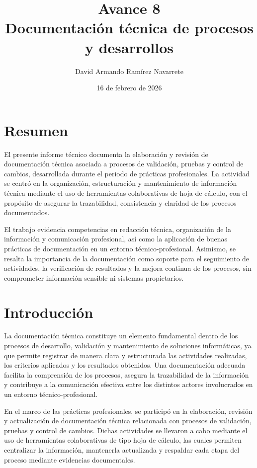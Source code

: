 \documentclass[12pt]{article}
\title{Avance 8 \\ Documentación técnica de procesos y desarrollos}
\author{David Armando Ramírez Navarrete}
\date{16 de febrero de 2026}
\begin{document}
\maketitle

\section*{Resumen}
El presente informe técnico documenta la elaboración y revisión de documentación técnica asociada a procesos de validación, pruebas y control de cambios, desarrollada durante el periodo de prácticas profesionales. La actividad se centró en la organización, estructuración y mantenimiento de información técnica mediante el uso de herramientas colaborativas de hoja de cálculo, con el propósito de asegurar la trazabilidad, consistencia y claridad de los procesos documentados.

El trabajo evidencia competencias en redacción técnica, organización de la información y comunicación profesional, así como la aplicación de buenas prácticas de documentación en un entorno técnico-profesional. Asimismo, se resalta la importancia de la documentación como soporte para el seguimiento de actividades, la verificación de resultados y la mejora continua de los procesos, sin comprometer información sensible ni sistemas propietarios.


\section*{Introducción}

La documentación técnica constituye un elemento fundamental dentro de los procesos de desarrollo, validación y mantenimiento de soluciones informáticas, ya que permite registrar de manera clara y estructurada las actividades realizadas, los criterios aplicados y los resultados obtenidos. Una documentación adecuada facilita la comprensión de los procesos, asegura la trazabilidad de la información y contribuye a la comunicación efectiva entre los distintos actores involucrados en un entorno técnico-profesional.

En el marco de las prácticas profesionales, se participó en la elaboración, revisión y actualización de documentación técnica relacionada con procesos de validación, pruebas y control de cambios. Dichas actividades se llevaron a cabo mediante el uso de herramientas colaborativas de tipo hoja de cálculo, las cuales permiten centralizar la información, mantenerla actualizada y respaldar cada etapa del proceso mediante evidencias documentales.
\end{document}
